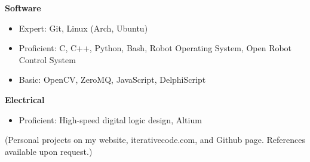 \documentclass[10pt,letterpaper,margin]{res}
\begin{document}
\begin{resume}
{\bf Software}\vspace{0.0em}

\begin{itemize}
	\item Expert: \hspace{10pt} Git, Linux (Arch, Ubuntu)
	\item Proficient: C, C++, Python, Bash, Robot Operating System, Open Robot Control System
	\item Basic: \hspace{17pt} OpenCV, ZeroMQ, JavaScript, DelphiScript
\end{itemize}

{\bf Electrical}\vspace{0.0em}

\begin{itemize}
	\item Proficient: High-speed digital logic design, Altium
\end{itemize}


\vspace{0.5em}
{\footnotesize (Personal projects on my website, iterativecode.com, and Github
page. References available upon request.)}

% 

\end{resume}



% 
% 
\end{document}
